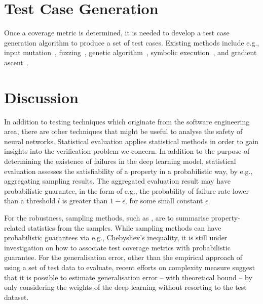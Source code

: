  

\section{Test Case Generation}\label{sec:testcasegen}

Once a coverage metric is determined, it is needed to develop a test case generation algorithm to produce a set of test cases. Existing methods include e.g., input mutation~\cite{wicker2018feature}, fuzzing~\cite{odena2018tensorfuzz}, genetic algorithm~\cite{9451178}, symbolic execution~\cite{sun2018concolic}, and gradient ascent~\cite{sun2018concolicb}. 



\section{Discussion}

In addition to testing techniques which originate from the software engineering area, there are other techniques that might be useful to analyse the safety of neural networks. 
%
Statistical evaluation applies statistical methods in order to gain insights into the verification problem we concern. In addition to the purpose of determining the existence of failures in the deep learning model, statistical evaluation assesses the satisfiability of a property in a probabilistic way, by e.g.,
aggregating sampling results. The aggregated evaluation result may have probabilistic guarantee, in the form of e.g., the probability of failure rate lower than a threshold $l$ is greater than $1-\epsilon$, for some small constant $\epsilon$. 



For the robustness, sampling methods, such as \cite{weng2018evaluating},
are to summarise property-related statistics from the samples. 
%
While sampling methods can have probabilistic guarantees via e.g., Chebyshev's inequality, it is still under investigation on how to associate test coverage metrics with probabilistic guarantee. 
%
For the generalisation error, other than the empirical approach of using a set of test data to evaluate, recent efforts on complexity measure \cite{chatterji2019intriguing,jin2020does} suggest that it is possible to estimate generalisation error -- with theoretical bound -- by only considering the weights of the deep learning without resorting to the test dataset. 

